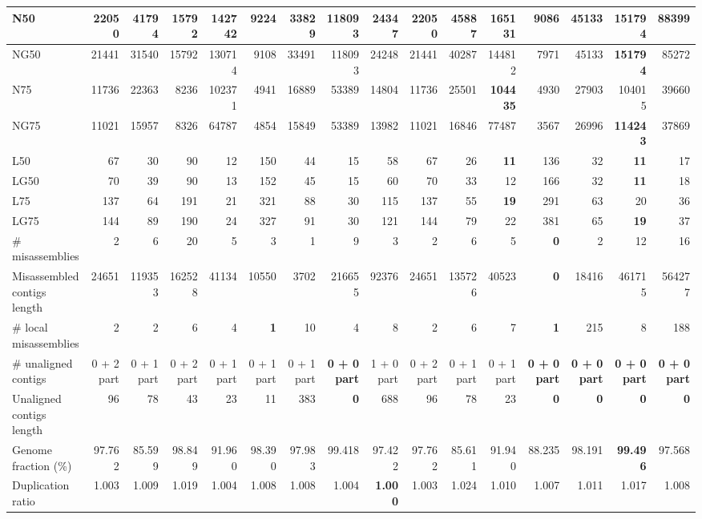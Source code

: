 \documentclass[12pt,a4paper]{article}
\begin{document}
\begin{table}[ht]
\begin{center}
\begin{tabular}{|l*{15}{|r}|}
N50 & 22050 & 41794 & 15792 & 142742 & 9224 & 33829 & 118093 & 24347 & 22050 & 45887 & {\bf 165131} & 9086 & 45133 & 151794 & 88399 \\ \hline
NG50 & 21441 & 31540 & 15792 & 130714 & 9108 & 33491 & 118093 & 24248 & 21441 & 40287 & 144812 & 7971 & 45133 & {\bf 151794} & 85272 \\ \hline
N75 & 11736 & 22363 & 8236 & 102371 & 4941 & 16889 & 53389 & 14804 & 11736 & 25501 & {\bf 104435} & 4930 & 27903 & 104015 & 39660 \\ \hline
NG75 & 11021 & 15957 & 8326 & 64787 & 4854 & 15849 & 53389 & 13982 & 11021 & 16846 & 77487 & 3567 & 26996 & {\bf 114243} & 37869 \\ \hline
L50 & 67 & 30 & 90 & 12 & 150 & 44 & 15 & 58 & 67 & 26 & {\bf 11} & 136 & 32 & {\bf 11} & 17 \\ \hline
LG50 & 70 & 39 & 90 & 13 & 152 & 45 & 15 & 60 & 70 & 33 & 12 & 166 & 32 & {\bf 11} & 18 \\ \hline
L75 & 137 & 64 & 191 & 21 & 321 & 88 & 30 & 115 & 137 & 55 & {\bf 19} & 291 & 63 & 20 & 36 \\ \hline
LG75 & 144 & 89 & 190 & 24 & 327 & 91 & 30 & 121 & 144 & 79 & 22 & 381 & 65 & {\bf 19} & 37 \\ \hline
\# misassemblies & 2 & 6 & 20 & 5 & 3 & 1 & 9 & 3 & 2 & 6 & 5 & {\bf 0} & 2 & 12 & 16 \\ \hline
Misassembled contigs length & 24651 & 119353 & 162528 & 41134 & 10550 & 3702 & 216655 & 92376 & 24651 & 135726 & 40523 & {\bf 0} & 18416 & 461715 & 564277 \\ \hline
\# local misassemblies & 2 & 2 & 6 & 4 & {\bf 1} & 10 & 4 & 8 & 2 & 6 & 7 & {\bf 1} & 215 & 8 & 188 \\ \hline
\# unaligned contigs & 0 + 2 part & 0 + 1 part & 0 + 2 part & 0 + 1 part & 0 + 1 part & 0 + 1 part & {\bf 0 + 0 part} & 1 + 0 part & 0 + 2 part & 0 + 1 part & 0 + 1 part & {\bf 0 + 0 part} & {\bf 0 + 0 part} & {\bf 0 + 0 part} & {\bf 0 + 0 part} \\ \hline
Unaligned contigs length & 96 & 78 & 43 & 23 & 11 & 383 & {\bf 0} & 688 & 96 & 78 & 23 & {\bf 0} & {\bf 0} & {\bf 0} & {\bf 0} \\ \hline
Genome fraction (\%) & 97.762 & 85.599 & 98.849 & 91.960 & 98.390 & 97.983 & 99.418 & 97.422 & 97.762 & 85.611 & 91.940 & 88.235 & 98.191 & {\bf 99.496} & 97.568 \\ \hline
Duplication ratio & 1.003 & 1.009 & 1.019 & 1.004 & 1.008 & 1.008 & 1.004 & {\bf 1.000} & 1.003 & 1.024 & 1.010 & 1.007 & 1.011 & 1.017 & 1.008 \\ \hline

\end{tabular}
\end{center}
\end{table}
\end{document}
